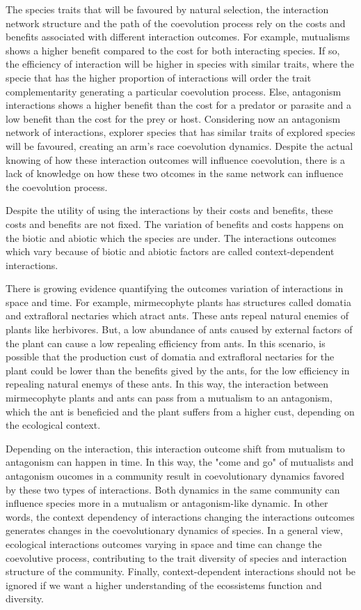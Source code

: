 \documentclass[a4paper, 12pt]{article}
\begin{document}
The species traits that will be favoured by natural selection, the interaction network structure and the path of the coevolution process rely on the costs and benefits associated with different interaction outcomes. For example, mutualisms shows a higher benefit compared to the cost for both interacting species. If so, the efficiency of interaction will be higher in species with similar traits, where  the specie that has the higher proportion of  interactions will order the trait complementarity generating a particular coevolution process. Else, antagonism interactions shows a higher benefit than the cost for a predator or parasite and a low benefit than the cost for the prey or host. Considering now an antagonism network of interactions, explorer species that has similar traits of explored species will be favoured, creating an arm's race coevolution dynamics. Despite the actual knowing of how these interaction outcomes will influence coevolution, there is a lack of knowledge on how these two otcomes in the same network can influence the coevolution process.


Despite the utility of using the interactions by their costs and benefits, these costs and benefits are not fixed. The variation of benefits and costs happens on the biotic and abiotic which the species are under. The interactions outcomes which vary because of biotic and abiotic factors are called context-dependent interactions.

There is growing evidence quantifying the outcomes variation of interactions in space and time. For example, mirmecophyte plants has structures called domatia and extrafloral nectaries which atract ants. These ants repeal natural enemies of plants like herbivores. But, a low abundance of ants caused by external factors of the plant can cause a low repealing efficiency from ants. In this scenario, is possible that the production cust of domatia and extrafloral nectaries for the plant could be lower than the benefits gived by the ants, for the low efficiency in repealing natural enemys of these ants. In this way, the interaction between mirmecophyte plants and ants can pass from a mutualism to an antagonism, which the ant is beneficied and the plant suffers from a higher cust, depending on the ecological context.

Depending on the interaction, this interaction outcome shift from mutualism to antagonism can happen in time. In this way, the "come and go" of mutualists and antagonism oucomes in a community result in coevolutionary dynamics favored by these two types of interactions. Both dynamics in the same community can influence species more in a mutualism or antagonism-like dynamic. In other words, the context dependency of interactions changing the interactions outcomes generates changes in the coevolutionary dynamics of species. In a general view, ecological interactions outcomes varying in space and time can change the coevolutive process, contributing to the trait diversity of species and interaction structure of the community. Finally, context-dependent interactions should not be ignored if we want a higher understanding of the ecossistems function and diversity. 
\end{document}
